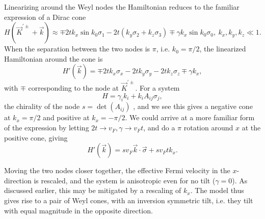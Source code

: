 Linearizing around the Weyl nodes the Hamiltonian reduces to the familiar expression of a Dirac cone
\begin{equation}
  \label{eq:7}
  H(\vec{K} ^{'\pm} + \vec{k}) \approx \mp 2 t k_{x} \sin k_{0} \sigma_{1} - 2 t (k_{y} \sigma_{2} + k_{z} \sigma_{3}) \mp \gamma k_{x} \sin k_{0} \sigma_{0}, \: k_{x}, k_{y}, k_{z} \ll 1.
\end{equation}
When the separation between the two nodes is \(\pi\), i.e. \(k_{0} = \pi/ 2 \), the linearized Hamiltonian around the cone is
\begin{equation}
  \label{eq:8}
  H'(\vec{k}) = \mp 2 t k_{x} \sigma_{x} - 2t k_{y} \sigma_{y} - 2 t k_{z} \sigma_{z} \mp \gamma k_{x},
\end{equation}
with \( \mp \) corresponding to the node at \( \vec{K}^{' \pm} \).
For a system
\begin{equation}
  \label{eq:155}
  H = \gamma_i k_i + k_i A_{ij} \sigma_j,
\end{equation}
the chirality of the node \( s = \det(A_{ij}) \) \cite{mccormickMinimalModelsTopological2017}, and we see this gives a negative cone at \( k_x = \pi /2 \) and positive at \( k_x = -\pi /2 \).
We could arrive at a more familiar form of the expression by letting \( 2 t \to v_F, \gamma \to v_F t \), and do a \( \pi \) rotation around \( x \) at the positive cone, giving
\begin{equation}
  \label{eq:158}
  H'(\vec{k}) = s v_F \vec{k} \cdot \vec{\sigma} + s v_F t k_x.
\end{equation}

Moving the two nodes closer together, the effective Fermi velocity in the \(x\)-direction is rescaled, and the system is anisotropic even for no tilt (\(\gamma=0\)).
As discussed earlier, this may be mitigated by a rescaling of \( k_x \).
The model thus gives rise to a pair of Weyl cones, with an inversion symmetric tilt, i.e. they tilt with equal magnitude in the opposite direction.


